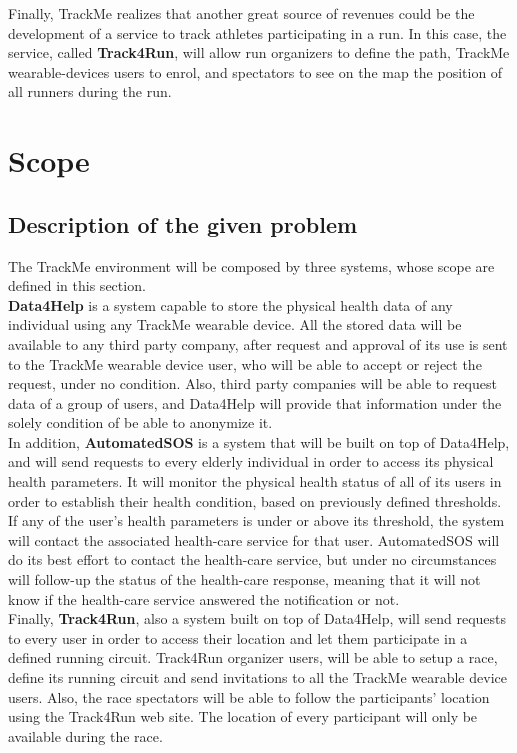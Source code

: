 \documentclass[a4paper, hidelinks, 12pt]{report}
\begin{document}
	Finally, TrackMe realizes that another great source of revenues could be the development of a service to track athletes participating in a run. In this case, the service, called \textbf{Track4Run}, will allow run organizers to define the path, TrackMe wearable-devices users to enrol, and spectators to see on the map the position of all runners during the run.
		
	\section{Scope}
	\subsection{Description of the given problem}
	The TrackMe environment will be composed by three systems, whose scope are defined in this section. \\
	
	\textbf{Data4Help} is a system capable to store the physical health data of any individual using any TrackMe wearable device. All the stored data will be available to any third party company, after request and approval of its use is sent to the TrackMe wearable device user, who will be able to accept or reject the request, under no condition. Also, third party companies will be able to request data of a group of users, and Data4Help will provide that information under the solely condition of be able to anonymize it.\\
	
	In addition, \textbf{AutomatedSOS} is a system that will be built on top of Data4Help, and will send requests to every elderly individual in order to access its physical health parameters. It will monitor the physical health status of all of its users in order to establish their health condition, based on previously defined thresholds. If any of the user's health parameters is under or above its threshold, the system will contact the associated health-care service for that user. AutomatedSOS will do its best effort to contact the health-care service, but under no circumstances will follow-up the status of the health-care response, meaning that it will not know if the health-care service answered the notification or not.\\
	
	Finally, \textbf{Track4Run}, also a system built on top of Data4Help, will send requests to every user in order to access their location and let them participate in a defined running circuit. Track4Run organizer users, will be able to setup a race, define its running circuit and send invitations to all the TrackMe wearable device users. Also, the race spectators will be able to follow the participants' location using the Track4Run web site. The location of every participant will only be available during the race.
	
\end{document}
